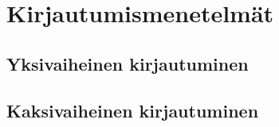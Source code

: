 \chapter{Kirjautumismenetelmät\label{kirjautumismenetelmät}}

\section{Yksivaiheinen kirjautuminen}


\section{Kaksivaiheinen kirjautuminen}